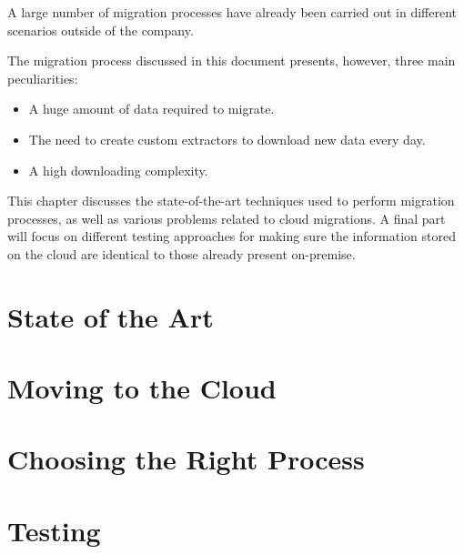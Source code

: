 A large number of migration processes have already been carried out in different scenarios outside of the company.

The migration process discussed in this document presents, however, three main peculiarities:
\begin{itemize}
    \item A huge amount of data required to migrate.
    \item The need to create custom extractors to download new data every day.
    \item A high downloading complexity.
\end{itemize}

This chapter discusses the state-of-the-art techniques used to perform migration processes, as well as various problems related to cloud migrations.
A final part will focus on different testing approaches for making sure the information stored on the cloud are identical to those already present on-premise.

\section{State of the Art}
    

\section{Moving to the Cloud}
    

\section{Choosing the Right Process}
    

\section{Testing}
    

